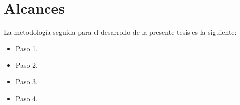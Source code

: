 \section{Alcances}

La metodología seguida para el desarrollo de la presente tesis es la siguiente:

\begin{itemize}
\item Paso 1.

\item Paso 2.

\item Paso 3.

\item Paso 4.


\end{itemize}





